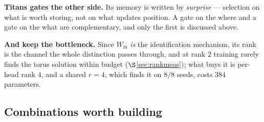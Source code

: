 \documentclass[11pt]{article}
\begin{document}
\textbf{Titans gates the other side.} Its memory is written by \emph{surprise} ---
selection on what is worth storing, not on what updates position. A gate on the
where and a gate on the what are complementary, and only the first is discussed
above.

\textbf{And keep the bottleneck.} Since $W_{\mathrm{in}}$ \emph{is} the
identification mechanism, its rank is the channel the whole distinction passes
through, and at rank $2$ training rarely finds the torus solution within budget
($\S$\ref{sec:rankmeas}); what buys it is per-head rank $4$, and a shared $r=4$, which
finds it on $8/8$ seeds, costs $384$ parameters.

\subsection{Combinations worth building}
\end{document}
